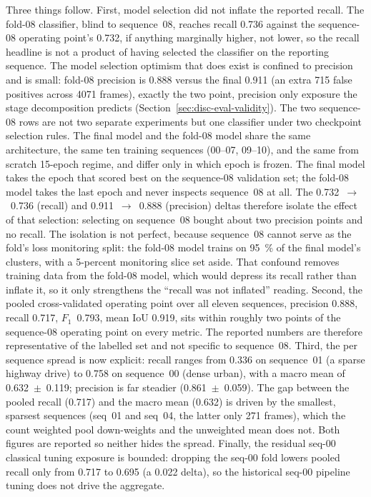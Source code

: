 \documentclass[a4paper,12pt]{report}
\begin{document}
Three things follow. First, model selection did not inflate the reported
recall. The fold-08 classifier, blind to sequence~08, reaches recall \num{0.736} against
the sequence-08 operating point's \num{0.732}, if anything marginally higher,
not lower, so the recall headline is not a product of having selected the
classifier on the reporting sequence. The model selection optimism that does
exist is confined to precision and is small: fold-08 precision is \num{0.888}
versus the final \num{0.911} (an extra \num{715} false positives across
\num{4071} frames), exactly the two point, precision only exposure the stage
decomposition predicts (Section~\ref{sec:disc-eval-validity}). The two
sequence-08 rows are not two separate experiments but one classifier under
two checkpoint selection rules. The final model and the fold-08 model share the
same architecture, the same ten training sequences (\numrange{00}{07},
\numrange{09}{10}), and the same from scratch \num{15}-epoch regime, and differ
only in which epoch is frozen. The final model takes the epoch that scored
best on the sequence-08 validation set; the fold-08 model takes the last epoch and
never inspects sequence~08 at all. The \num{0.732}~$\rightarrow$~\num{0.736}
(recall) and \num{0.911}~$\rightarrow$~\num{0.888} (precision) deltas therefore
isolate the effect of that selection: selecting on sequence~08 bought about two
precision points and no recall. The isolation is not perfect, because
sequence~08 cannot serve as the fold's loss monitoring split: the fold-08 model
trains on \SI{95}{\percent} of the final model's clusters, with a \num{5}-percent
monitoring slice set aside. That confound removes training data from
the fold-08 model, which would depress its recall rather than inflate it, so it only
strengthens the ``recall was not inflated'' reading. Second, the
pooled cross-validated operating point over all eleven sequences,
precision \num{0.888}, recall \num{0.717}, $F_1$~\num{0.793}, mean IoU
\num{0.919}, sits within roughly two points of the sequence-08 operating point
on every metric. The reported numbers are therefore representative of the labelled set
and not specific to sequence~08. Third, the per sequence spread is now
explicit: recall ranges from \num{0.336} on sequence~01 (a sparse highway drive)
to \num{0.758} on sequence~00 (dense urban), with a macro mean of
\num{0.632}~$\pm$~\num{0.119}; precision is far steadier
(\num{0.861}~$\pm$~\num{0.059}). The gap between the pooled recall (\num{0.717})
and the macro mean (\num{0.632}) is driven by the smallest, sparsest sequences
(seq~01 and seq~04, the latter only \num{271} frames), which the count weighted
pool down-weights and the unweighted mean does not. Both figures are reported so
neither hides the spread. Finally, the residual seq-00 classical tuning exposure
is bounded: dropping the seq-00 fold lowers pooled recall only from \num{0.717}
to \num{0.695} (a \num{0.022} delta), so the historical seq-00 pipeline tuning
does not drive the aggregate.
\end{document}
